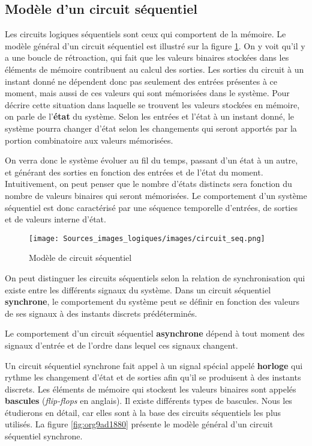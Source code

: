 \documentclass[11pt]{article}
\begin{document}
\subsection{Modèle d'un circuit séquentiel}
\label{sec:orgd6ea246}

Les circuits logiques séquentiels sont ceux qui comportent de la
mémoire. Le modèle général d'un circuit séquentiel est illustré sur la
figure \ref{fig:org8cc14c3}. On y voit qu'il y a une boucle de rétroaction,
qui fait que les valeurs binaires stockées dans les éléments de
mémoire contribuent au calcul des sorties. Les sorties du circuit à un
instant donné ne dépendent donc pas seulement des entrées présentes à
ce moment, mais aussi de ces valeurs qui sont mémorisées dans le
système. Pour décrire cette situation dans laquelle se trouvent les
valeurs stockées en mémoire, on parle de l'\textbf{état} du système. Selon
les entrées et l'état à un instant donné, le système pourra changer
d'état selon les changements qui seront apportés par la portion
combinatoire aux valeurs mémorisées.

On verra donc le système évoluer au fil du temps, passant d'un état à
un autre, et générant des sorties en fonction des entrées et de l'état
du moment. Intuitivement, on peut penser que le nombre d'états
distincts sera fonction du nombre de valeurs binaires qui seront
mémorisées. Le comportement d'un système séquentiel est donc
caractérisé par une séquence temporelle d'entrées, de sorties et de
valeurs interne d'état.

\begin{figure}[htbp]
\centering
\texttt{[image: Sources\_images\_logiques/images/circuit\_seq.png]}
\caption{\label{fig:org8cc14c3}Modèle de circuit séquentiel}
\end{figure}

On peut distinguer les circuits séquentiels selon la relation de
synchronisation qui existe entre les différents signaux du
système. Dans un circuit séquentiel \textbf{synchrone}, le comportement du
système peut se définir en fonction des valeurs de ses signaux à des
instants discrets prédéterminés. 

Le comportement d'un circuit séquentiel \textbf{asynchrone} dépend à tout
moment des signaux d'entrée et de l'ordre dans lequel ces signaux
changent.

Un circuit séquentiel synchrone fait appel à un signal spécial appelé
\textbf{horloge} qui rythme les changement d'état et de sorties afin qu'il se
produisent à des instants discrets. Les éléments de mémoire qui
stockent les valeurs binaires sont appelés \textbf{bascules} (\emph{flip-flops} en
anglais). Il existe différents types de bascules. Nous les étudierons
en détail, car elles sont à la base des circuits séquentiels les plus
utilisés. La figure \ref{fig:org9ad1880} présente le modèle général d'un
circuit séquentiel synchrone.
\end{document}
